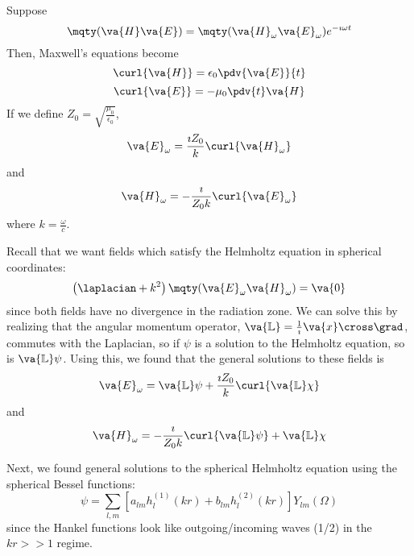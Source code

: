\documentclass[a4paper,twoside,master.tex]{subfiles}
\begin{document}

Suppose
\begin{equation}
    \mqty( \va{H} \\ \va{E} ) = \mqty( \va{H}_{\omega} \\ \va{E}_{\omega} ) e^{- \imath \omega t}
\end{equation}
Then, Maxwell's equations become
\begin{equation}
    \curl{ \va{H}} = \epsilon_0 \pdv{ \va{E}}{t}
\end{equation}
\begin{equation}
    \curl{ \va{E}} = - \mu_0 \pdv{t} \va{H}
\end{equation}
If we define $ Z_0 = \sqrt{\frac{\mu_0}{\epsilon_0}} $,
\begin{equation}
    \va{E}_{\omega} = \frac{\imath Z_0}{k} \curl{ \va{H}_{\omega}}
\end{equation}
and
\begin{equation}
    \va{H}_{\omega} = - \frac{\imath}{Z_0 k} \curl{ \va{E}_{\omega}}
\end{equation}
where $ k = \frac{\omega}{c} $.

Recall that we want fields which satisfy the Helmholtz equation in spherical coordinates:
\begin{equation}
    \left( \laplacian + k^2 \right) \mqty( \va{E}_{\omega} \\ \va{H}_{\omega}) = \va{0}
\end{equation}
since both fields have no divergence in the radiation zone. We can solve this by realizing that the angular momentum operator, $ \va{\mathbb{L}} = \frac{1}{\imath} \va{x} \cross \grad $, commutes with the Laplacian, so if $ \psi $ is a solution to the Helmholtz equation, so is $ \va{\mathbb{L}} \psi $. Using this, we found that the general solutions to these fields is
\begin{equation}
    \va{E}_{\omega} = \va{\mathbb{L}} \psi + \frac{\imath Z_0}{k} \curl{ \va{\mathbb{L}} \chi}
\end{equation}
and
\begin{equation}
    \va{H}_{\omega} = - \frac{\imath}{Z_0 k} \curl{ \va{\mathbb{L}} \psi} + \va{\mathbb{L}} \chi
\end{equation}

Next, we found general solutions to the spherical Helmholtz equation using the spherical Bessel functions:
\begin{equation}
    \psi = \sum_{l,m} \left[ a_{lm} h_{l}^{(1)}(kr) + b_{lm} h_{l}^{(2)}(kr) \right] Y_{lm}(\Omega)
\end{equation}
since the Hankel functions look like outgoing/incoming waves (1/2) in the $ kr >> 1 $ regime.
\end{document}
